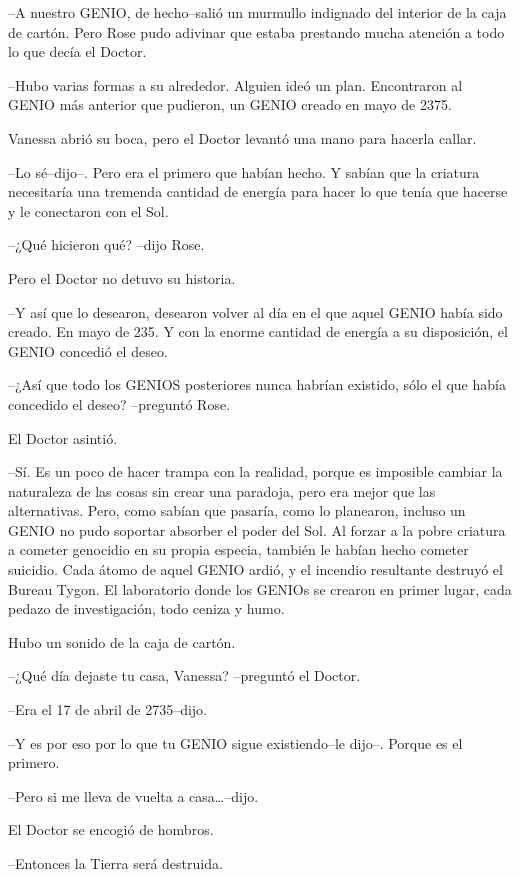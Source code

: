 --A nuestro GENIO, de hecho--salió un murmullo indignado del interior de
la caja de cartón. Pero Rose pudo adivinar que estaba prestando mucha
atención a todo lo que decía el Doctor.

--Hubo varias formas a su alrededor. Alguien ideó un plan. Encontraron
al GENIO más anterior que pudieron, un GENIO creado en mayo de 2375.

Vanessa abrió su boca, pero el Doctor levantó una mano para hacerla
callar.

--Lo sé--dijo--. Pero era el primero que habían hecho. Y sabían que la
criatura necesitaría una tremenda cantidad de energía para hacer lo que
tenía que hacerse y le conectaron con el Sol.

--¿Qué hicieron qué? --dijo Rose.

Pero el Doctor no detuvo su historia.

--Y así que lo desearon, desearon volver al día en el que aquel GENIO
había sido creado. En mayo de 235. Y con la enorme cantidad de energía a
su disposición, el GENIO concedió el deseo.

--¿Así que todo los GENIOS posteriores nunca habrían existido, sólo el
que había concedido el deseo? --preguntó Rose.

El Doctor asintió.

--Sí. Es un poco de hacer trampa con la realidad, porque es imposible
cambiar la naturaleza de las cosas sin crear una paradoja, pero era
mejor que las alternativas. Pero, como sabían que pasaría, como lo
planearon, incluso un GENIO no pudo soportar absorber el poder del Sol.
Al forzar a la pobre criatura a cometer genocidio en su propia especia,
también le habían hecho cometer suicidio. Cada átomo de aquel GENIO
ardió, y el incendio resultante destruyó el Bureau Tygon. El laboratorio
donde los GENIOs se crearon en primer lugar, cada pedazo de
investigación, todo ceniza y humo.

Hubo un sonido de la caja de cartón.

--¿Qué día dejaste tu casa, Vanessa? --preguntó el Doctor.

--Era el 17 de abril de 2735--dijo.

--Y es por eso por lo que tu GENIO sigue existiendo--le dijo--. Porque
es el primero.

--Pero si me lleva de vuelta a casa\ldots{}--dijo.

El Doctor se encogió de hombros.

--Entonces la Tierra será destruida.

